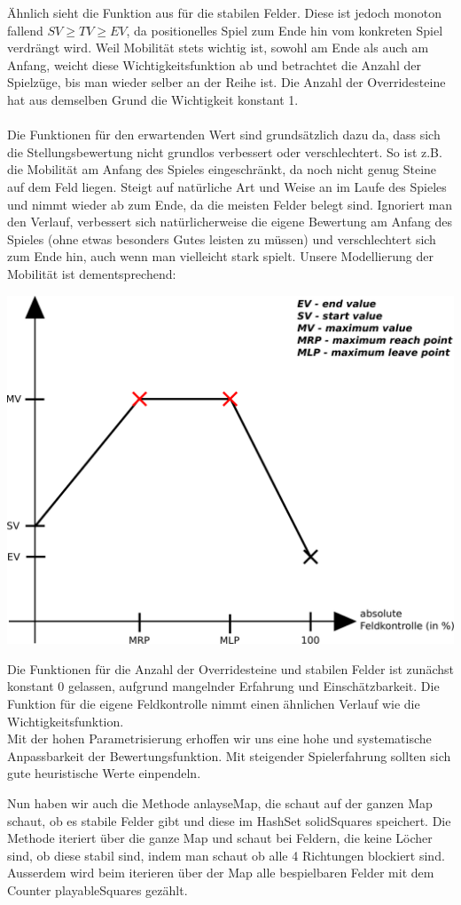 Ähnlich sieht die Funktion aus für die stabilen Felder. Diese ist jedoch monoton fallend $SV \geq TV \geq EV$, da positionelles Spiel zum Ende hin vom konkreten Spiel verdrängt wird. Weil Mobilität stets wichtig ist, sowohl am Ende als auch am Anfang, weicht diese Wichtigkeitsfunktion ab und betrachtet die Anzahl der Spielzüge, bis man wieder selber an der Reihe ist. Die Anzahl der Overridesteine hat aus demselben Grund die Wichtigkeit konstant 1.\\\\
Die Funktionen für den erwartenden Wert sind grundsätzlich dazu da, dass sich die Stellungsbewertung nicht grundlos verbessert oder verschlechtert. So ist z.B. die Mobilität am Anfang des Spieles eingeschränkt, da noch nicht genug Steine auf dem Feld liegen. Steigt auf natürliche Art und Weise an im Laufe des Spieles und nimmt wieder ab zum Ende, da die meisten Felder belegt sind. Ignoriert man den Verlauf, verbessert sich natürlicherweise die eigene Bewertung am Anfang des Spieles (ohne etwas besonders Gutes leisten zu müssen) und verschlechtert sich zum Ende hin, auch wenn man vielleicht stark spielt. Unsere Modellierung der Mobilität ist dementsprechend:
\begin{center}
\includegraphics[scale=0.15]{ExpectedValueFunction.pdf}
\end{center}
Die Funktionen für die Anzahl der Overridesteine und stabilen Felder ist zunächst konstant 0 gelassen, aufgrund mangelnder Erfahrung und Einschätzbarkeit. Die Funktion für die eigene Feldkontrolle nimmt einen ähnlichen Verlauf wie die Wichtigkeitsfunktion.\\
Mit der hohen Parametrisierung erhoffen wir uns eine hohe und systematische Anpassbarkeit der Bewertungsfunktion. Mit steigender Spielerfahrung sollten sich gute heuristische Werte einpendeln.
\newline

\noindent
Nun haben wir auch die Methode anlayseMap, die schaut auf der ganzen Map schaut, ob es stabile Felder gibt und diese im HashSet solidSquares speichert. Die Methode iteriert über die ganze Map und schaut bei Feldern, die keine Löcher sind, ob diese stabil sind, indem man schaut ob alle 4 Richtungen blockiert sind. Ausserdem wird beim iterieren über der Map alle bespielbaren Felder mit dem Counter playableSquares gezählt.

